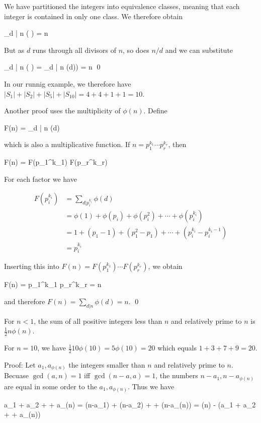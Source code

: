 We have partitioned the integers into equivalence classes, meaning that each integer is contained in only one class. We therefore obtain

\bee
\sum_{d | n} \phi \left(  \right) = n
\eee

But as $d$ runs through all divisors of $n$, so does $n/d$ and we can substitute

\bee
\sum_{d | n} \phi \left(  \right) = \sum_{d | n} \phi(d)) = n \qed
\eee

In our runnig example, we therefore have $|S_1| + |S_2| + |S_5| + |S_{10}| = 4 + 4 + 1 + 1 = 10$.

Another proof uses the multiplicity of $\phi(n)$. Define

\bee
F(n) = \sum_{d | n} \phi(d)
\eee

which is also a multiplicative function. If $n = p_1^{k_1} \cdots p_r^{k_r}$, then

\bee
F(n) = F(p_1^{k_1}) \cdots F(p_r^{k_r})
\eee

For each factor we have

\begin{align*}
  F(p_i^{k_i}) &= \sum_{d | p_i^{k_i} } \phi(d) \\
  &= \phi(1) + \phi(p_i) + \phi(p_i^2) + \cdots + \phi(p_i^{k_i}) \\
  &= 1 + (p_1 - 1)+  (p_1^2 - p_1) + \cdots + (p_i^{k_i} - p_i^{k_i-1}) \\
  &= p_i^{k_i}
\end{align*}

Inserting this into $F(n) = F(p_1^{k_1}) \cdots F(p_r^{k_r})$, we obtain

\bee
F(n) = p_1^{k_1} \cdots p_r^{k_r} = n
\eee

and therefore $F(n) = \sum_{d | n} \phi(d) = n$. \qed


\begin{theorem}
  For $n<1$, the sum of all positive integers less than $n$ and relatively prime to $n$ is $\frac{1}{2}n\phi(n)$.
\end{theorem}

For $n = 10$, we have $\frac{1}{2}10 \phi(10) = 5 \phi(10) = 20$ which equals $1 + 3 + 7 + 9 = 20$.

Proof: Let $a_1, a_{\phi(n)}$ the integers smaller than $n$ and relatively prime to $n$. Becuase $\gcd(a,n) = 1$ iff $\gcd(n-a,a) = 1$, the numbers $n - a_1, n - a_{\phi(n)}$ are equal in some order to the $a_1, a_{\phi(n)}$. Thus we have

\bee
a_1 + a_2 + \cdots + a_{\phi(n)} = (n-a_1) + (n-a_2) + \cdots + (n-a_{\phi(n)}) = \phi(n) - (a_1 + a_2 + \cdots + a_{\phi(n)})
\eee

